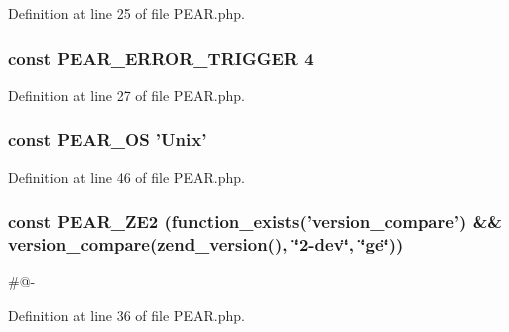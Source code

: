 Definition at line 25 of file P\-E\-A\-R.\-php.

\hypertarget{PEAR_8php_a23a071419e1d6bbb554976e21d978d56}{
\subsubsection[{P\-E\-A\-R\-\_\-\-E\-R\-R\-O\-R\-\_\-\-T\-R\-I\-G\-G\-E\-R}]{\setlength{\rightskip}{0pt plus 5cm}const P\-E\-A\-R\-\_\-\-E\-R\-R\-O\-R\-\_\-\-T\-R\-I\-G\-G\-E\-R 4}}\label{PEAR_8php_a23a071419e1d6bbb554976e21d978d56}


Definition at line 27 of file P\-E\-A\-R.\-php.

\hypertarget{PEAR_8php_a5fd2c8f5bc659f777ab39b8bfd745c4c}{
\subsubsection[{P\-E\-A\-R\-\_\-\-O\-S}]{\setlength{\rightskip}{0pt plus 5cm}const P\-E\-A\-R\-\_\-\-O\-S 'Unix'}}\label{PEAR_8php_a5fd2c8f5bc659f777ab39b8bfd745c4c}


Definition at line 46 of file P\-E\-A\-R.\-php.

\hypertarget{PEAR_8php_a16b6fef5a6547779f3d9d6e1b7c5c2b5}{
\subsubsection[{P\-E\-A\-R\-\_\-\-Z\-E2}]{\setlength{\rightskip}{0pt plus 5cm}const P\-E\-A\-R\-\_\-\-Z\-E2 (function\-\_\-exists('version\-\_\-compare') \&\& version\-\_\-compare(zend\-\_\-version(), \char`\"{}2-\/dev\char`\"{}, \char`\"{}ge\char`\"{}))}}\label{PEAR_8php_a16b6fef5a6547779f3d9d6e1b7c5c2b5}
\#@-\/ 

Definition at line 36 of file P\-E\-A\-R.\-php.

